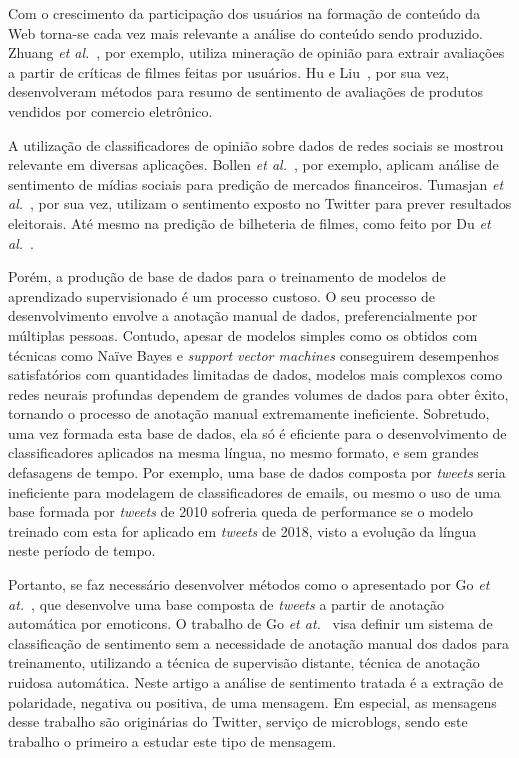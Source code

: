 Com o crescimento da participação dos usuários na formação de conteúdo da Web torna-se cada vez mais relevante a análise
do conteúdo sendo produzido.
Zhuang \textit{et al.}~\cite{zhuang06}, por exemplo, utiliza mineração de opinião para extrair avaliações a partir de
críticas de filmes feitas por usuários.
Hu e Liu~\cite{hu04}, por sua vez, desenvolveram métodos para resumo de sentimento de avaliações de produtos vendidos
por comercio eletrônico.

A utilização de classificadores de opinião sobre dados de redes sociais se mostrou relevante em diversas aplicações.
Bollen \textit{et al.}~\cite{bollen11}, por exemplo, aplicam análise de sentimento de mídias sociais para predição de
mercados financeiros.
Tumasjan \textit{et al.}~\cite{tumasjan10}, por sua vez, utilizam o sentimento exposto no Twitter para prever resultados
eleitorais.
Até mesmo na predição de bilheteria de filmes, como feito por Du \textit{et al.}~\cite{du14}.

Porém, a produção de base de dados para o treinamento de modelos de aprendizado supervisionado é um processo custoso.
O seu processo de desenvolvimento envolve a anotação manual de dados, preferencialmente por múltiplas pessoas.
Contudo, apesar de modelos simples como os obtidos com técnicas como Naïve Bayes e \textit{support vector machines}
conseguirem desempenhos satisfatórios com quantidades limitadas de dados, modelos mais complexos como redes neurais
profundas dependem de grandes volumes de dados para obter êxito, tornando o processo de anotação manual extremamente
ineficiente.
Sobretudo, uma vez formada esta base de dados, ela só é eficiente para o desenvolvimento de classificadores aplicados
na mesma língua, no mesmo formato, e sem grandes defasagens de tempo.
Por exemplo, uma base de dados composta por \textit{tweets} seria ineficiente para modelagem de classificadores de
emails, ou mesmo o uso de uma base formada por \textit{tweets} de 2010 sofreria queda de performance se o modelo
treinado com esta for aplicado em \textit{tweets} de 2018, visto a evolução da língua neste período de tempo.

Portanto, se faz necessário desenvolver métodos como o apresentado por Go \textit{et at.}~\cite{go09}, que desenvolve
uma base composta de \textit{tweets} a partir de anotação automática por emoticons.
O trabalho de Go \textit{et at.}~\cite{go09} visa definir um sistema de classificação de sentimento sem a necessidade de
anotação manual dos dados para treinamento, utilizando a técnica de supervisão distante, técnica de anotação ruidosa
automática.
Neste artigo a análise de sentimento tratada é a extração de polaridade, negativa ou positiva, de uma mensagem.
Em especial, as mensagens desse trabalho são originárias do Twitter, serviço de microblogs, sendo este trabalho o
primeiro a estudar este tipo de mensagem.

